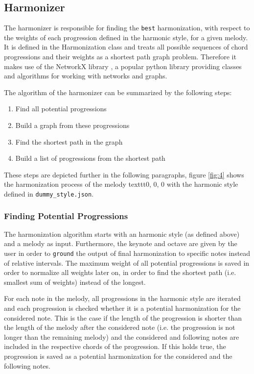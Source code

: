 \subsection{Harmonizer}
The harmonizer is responsible for finding the \texttt{best} harmonization, with respect to the weights of each progression defined in the harmonic style, for a given melody. It is defined in the Harmonization class and treats all possible sequences of chord progressions and their weights as a shortest path graph problem. Therefore it makes use of the NetworkX library \cite{networkx}, a popular python library providing classes and algorithms for working with networks and graphs.

The algorithm of the harmonizer can be summarized by the following steps:
\begin{enumerate}
  \item Find all potential progressions
  \item Build a graph from these progressions
  \item Find the shortest path in the graph
  \item Build a list of progressions from the shortest path
\end{enumerate}
These steps are depicted further in the following paragraphs, figure \ref{fig:4} shows the harmonization process of the melody texttt{0, 0, 0} with the harmonic style defined in \texttt{dummy\_style.json}.

\subsubsection{Finding Potential Progressions}
The harmonization algorithm starts with an harmonic style (as defined above) and a melody as input. Furthermore, the keynote and octave are given by the user in order to \texttt{ground} the output of final harmonization to specific notes instead of relative intervals. The maximum weight of all potential progressions is saved in order to normalize all weights later on, in order to find the shortest path (i.e. smallest sum of weights) instead of the longest.

For each note in the melody, all progressions in the harmonic style are iterated and each progression is checked whether it is a potential harmonization for the considered note. This is the case if the length of the progression is shorter than the length of the melody after the considered note (i.e. the progression is not longer than the remaining melody) and the considered and following notes are included in the respective chords of the progression. If this holds true, the progression is saved as a potential harmonization for the considered and the following notes.

